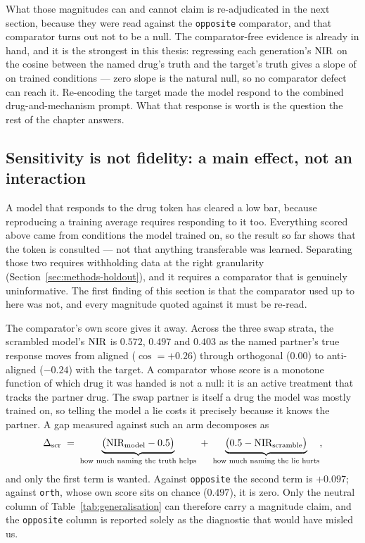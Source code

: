 What those magnitudes can and cannot claim is re-adjudicated in the next section, because they were
read against the \texttt{opposite} comparator, and that comparator turns out not to be a null. The
comparator-free evidence is already in hand, and it is the strongest in this thesis: regressing each
generation's $\textrm{NIR}$ on the cosine between the named drug's truth and the target's truth gives a
slope of  on trained conditions --- zero slope is the natural null, so
no comparator defect can reach it. Re-encoding the target made the model respond to the combined
drug-and-mechanism prompt. What that response is worth is the question the rest of the chapter
answers.

\subsection{Sensitivity is not fidelity: a main effect, not an interaction}
\label{sec:res-generalisation}

A model that responds to the drug token has cleared a low bar, because reproducing a training
average requires responding to it too. Everything scored above came from conditions the model
trained on, so the result so far shows that the token is consulted --- not that anything
transferable was learned. Separating those two requires withholding data at the right granularity
(Section~\ref{sec:methods-holdout}), and it requires a comparator that is genuinely uninformative.
The first finding of this section is that the comparator used up to here was not, and every
magnitude quoted against it must be re-read.

The comparator's own score gives it away. Across the three swap strata, the scrambled model's
$\textrm{NIR}$ is $0.572$, $0.497$ and $0.403$ as the named partner's true response moves from aligned
($\cos = +0.26$) through orthogonal ($0.00$) to anti-aligned ($-0.24$) with the target. A
comparator whose score is a monotone function of which drug it was handed is not a null: it is an
active treatment that tracks the partner drug. The swap partner is itself a drug the model was
mostly trained on, so telling the model a lie costs it precisely because it knows the partner. A
gap measured against such an arm decomposes as
\begin{equation}
  \Delta_{\textrm{scr}} \;=\; \underbrace{\big(\textrm{NIR}_{\textrm{model}} - 0.5\big)}_{\textrm{how much naming the truth helps}}
  \;+\; \underbrace{\big(0.5 - \textrm{NIR}_{\textrm{scramble}}\big)}_{\textrm{how much naming the lie hurts}},
\end{equation}
and only the first term is wanted. Against \texttt{opposite} the second term is $+0.097$; against
\texttt{orth}, whose own score sits on chance ($0.497$), it is zero. Only the neutral column of
Table~\ref{tab:generalisation} can therefore carry a magnitude claim, and the
\texttt{opposite} column is reported solely as the diagnostic that would have misled us.

